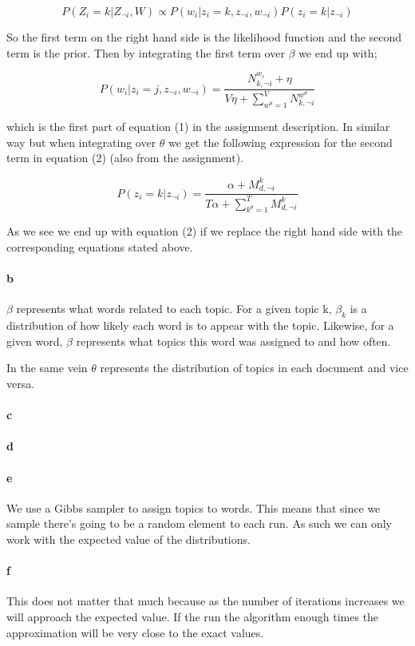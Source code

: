 \documentclass{article}
\begin{document}
\begin{equation*}
P(Z_i = k \vert Z_{\neg i}, W) \propto P(w_i \vert z_i = k, z_{\neg i}, w_{\neg i})P(z_i = k \vert z_{\neg i })
\end{equation*}

So the first term on the right hand side is the likelihood function and the
second term is the prior. Then by integrating the first term over $\beta$ we
end up with;

\begin{equation*}
P(w_i \vert z_i = j, z_{\neg i}, w_{\neg i}) = \frac{ N^{w_i}_{k,\neg i} + \eta }{V\eta + \sum_{w^{\theta}=1}^V N^{w^\theta}_{k, \neg i}}
\end{equation*}

which is the first part of equation (1) in the assignment description. In
similar way but when integrating over $\theta$ we get the following expression
for the second term in equation (2) (also from the assignment).

\begin{equation*}
P(z_i = k \vert z_{\neg i}) = \frac{\alpha + M^{k}_{d,\neg i}}{T\alpha + \sum_{k^\theta=1}^T M^k_{d, \neg i} }
\end{equation*}

As we see we end up with equation (2) if we replace the right hand side with
the corresponding equations stated above.

\paragraph{b}

$\beta$ represents what words related to each topic. For a given topic k,
$\beta_k$ is a distribution of how likely each word is to appear with the
topic. Likewise, for a given word, $\beta$ represents what topics this word was
assigned to and how often.

In the same vein $\theta$ represents the distribution of topics in each
document and vice versa.

\paragraph{c}
\paragraph{d}
\paragraph{e}

We use a Gibbs sampler to assign topics to words. This means that since we
sample there's going to be a random element to each run. As such we can only
work with the expected value of the distributions.

\paragraph{f}

This does not matter that much because as the number of iterations increases we
will approach the expected value. If the run the algorithm enough times the
approximation will be very close to the exact values.
\end{document}
